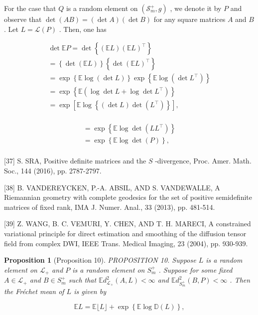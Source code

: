\documentclass[11pt]{article}
\newtheorem{proposition}{Proposition}
\begin{document}
For the case that  $Q$  is a random element on  $(\mathcal{S}_m^+, g)$ , we denote it by  $P$  and observe that  $\operatorname{det}(AB) = (\operatorname{det} A)(\operatorname{det} B)$  for any square matrices  $A$  and  $B$ . Let  $L = \mathcal{L}(P)$ . Then, one has

$$
\begin{array}{l} \det  \mathbb {E} P = \det  \left\{\left(\mathbb {E} L\right) \left(\mathbb {E} L\right) ^ {\top} \right\} \\ = \left\{\det  (\mathbb {E} L) \right\} \left\{\det  (\mathbb {E} L) ^ {\top} \right\} \\ = \exp \left\{\mathbb {E} \log (\det  L) \right\} \exp \left\{\mathbb {E} \log (\det  L ^ {\top}) \right\} \\ = \exp \left\{\mathbb {E} \left(\log \det  L + \log \det  L ^ {\top}\right) \right\} \\ = \exp \left[ \mathbb {E} \log \left\{\left(\det  L\right) \det  \left(L ^ {\top}\right) \right\} \right], \\ \end{array}
$$

$$
\begin{array}{l} = \exp \left\{\mathbb {E} \log \det  (L L ^ {\top}) \right\} \\ = \exp \left\{\mathbb {E} \log \det  (P) \right\}, \\ \end{array}
$$

[37] S. SRA, Positive definite matrices and the  $S$ -divergence, Proc. Amer. Math. Soc., 144 (2016), pp. 2787-2797.

[38] B. VANDEREYCKEN, P.-A. ABSIL, AND S. VANDEWALLE, A Riemannian geometry with complete geodesics for the set of positive semidefinite matrices of fixed rank, IMA J. Numer. Anal., 33 (2013), pp. 481-514.

[39] Z. WANG, B. C. VEMURI, Y. CHEN, AND T. H. MARECI, A constrained variational principle for direct estimation and smoothing of the diffusion tensor field from complex DWI, IEEE Trans. Medical Imaging, 23 (2004), pp. 930-939.


\begin{proposition}[Proposition 10]
PROPOSITION 10. Suppose  $L$  is a random element on  $\mathcal{L}_{+}$  and  $P$  is a random element on  $S_{m}^{+}$ . Suppose for some fixed  $A \in \mathcal{L}_{+}$  and  $B \in S_{m}^{+}$  such that  $\mathbb{E}d_{\mathcal{L}_{+}}^{2}(A,L) < \infty$  and  $\mathbb{E}d_{S_m^+}^2 (B,P) < \infty$ . Then the Fréchet mean of  $L$  is given by

$$
\mathbb {E} L = \mathbb {E} \lfloor L \rfloor + \exp \left\{\mathbb {E} \log \mathbb {D} (L) \right\}, \tag {4.1}
$$
\end{proposition}
\end{document}
